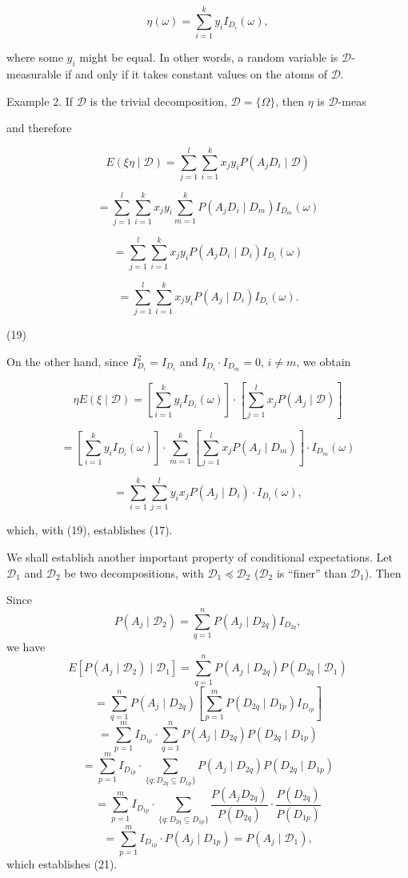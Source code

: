 $$\eta(\omega) = \sum_{i=1}^{k} y_i I_{D_i}(\omega),$$

where some $y_i$ might be equal. In other words, a random variable is $\mathcal{D}$-measurable if and only if it takes constant values on the atoms of $\mathcal{D}$.

Example 2. If $\mathcal{D}$ is the trivial decomposition, $\mathcal{D} = \{\Omega\}$, then $\eta$ is $\mathcal{D}$-meas

and therefore

$$E(\xi \eta \mid \mathcal{D}) = \sum_{j=1}^{l} \sum_{i=1}^{k} x_j y_i P(A_j D_i \mid \mathcal{D})$$

$$= \sum_{j=1}^{l} \sum_{i=1}^{k} x_j y_i \sum_{m=1}^{k} P(A_j D_i \mid D_m) I_{D_m}(\omega)$$

$$= \sum_{j=1}^{l} \sum_{i=1}^{k} x_j y_i P(A_j D_i \mid D_i) I_{D_i}(\omega)$$

$$= \sum_{j=1}^{l} \sum_{i=1}^{k} x_j y_i P(A_j \mid D_i) I_{D_i}(\omega).$$

(19)

On the other hand, since $I_{D_i}^2 = I_{D_i}$ and $I_{D_i} \cdot I_{D_m} = 0$, $i \neq m$, we obtain

$$\eta E(\xi \mid \mathcal{D}) = \left[ \sum_{i=1}^{k} y_i I_{D_i}(\omega) \right] \cdot \left[ \sum_{j=1}^{l} x_j P(A_j \mid \mathcal{D}) \right]$$

$$= \left[ \sum_{i=1}^{k} y_i I_{D_i}(\omega) \right] \cdot \sum_{m=1}^{k} \left[ \sum_{j=1}^{l} x_j P(A_j \mid D_m) \right] \cdot I_{D_m}(\omega)$$

$$= \sum_{i=1}^{k} \sum_{j=1}^{l} y_i x_j P(A_j \mid D_i) \cdot I_{D_i}(\omega),$$

which, with (19), establishes (17).

We shall establish another important property of conditional expectations. Let $\mathcal{D}_1$ and $\mathcal{D}_2$ be two decompositions, with $\mathcal{D}_1 \preceq \mathcal{D}_2$ ($\mathcal{D}_2$ is “finer” than $\mathcal{D}_1$). Then

Since
$$P(A_j \mid \mathcal{D}_2) = \sum_{q=1}^{n} P(A_j \mid D_{2q}) I_{D_{2q}},$$
we have
$$E[P(A_j \mid \mathcal{D}_2) \mid \mathcal{D}_1] = \sum_{q=1}^{n} P(A_j \mid D_{2q}) P(D_{2q} \mid \mathcal{D}_1)$$
$$= \sum_{q=1}^{n} P(A_j \mid D_{2q}) \left[ \sum_{p=1}^{m} P(D_{2q} \mid D_{1p}) I_{D_{1p}} \right]$$
$$= \sum_{p=1}^{m} I_{D_{1p}} \cdot \sum_{q=1}^{n} P(A_j \mid D_{2q}) P(D_{2q} \mid D_{1p})$$
$$= \sum_{p=1}^{m} I_{D_{1p}} \cdot \sum_{\{q : D_{2q} \subseteq D_{1p}\}} P(A_j \mid D_{2q}) P(D_{2q} \mid D_{1p})$$
$$= \sum_{p=1}^{m} I_{D_{1p}} \cdot \sum_{\{q : D_{2q} \subseteq D_{1p}\}} \frac{P(A_j D_{2q})}{P(D_{2q})} \cdot \frac{P(D_{2q})}{P(D_{1p})}$$
$$= \sum_{p=1}^{m} I_{D_{1p}} \cdot P(A_j \mid D_{1p}) = P(A_j \mid \mathcal{D}_1),$$
which establishes (21).


